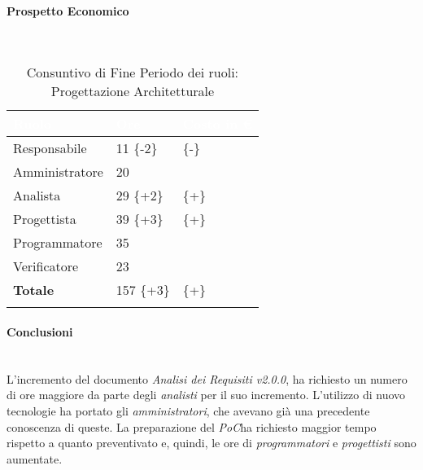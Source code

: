 \paragraph{Prospetto Economico} ~\\

\begin{longtable}{| C{.30\textwidth}| C{.15\textwidth}| C{.20\textwidth}|}
\hline
{}\textbf{\textcolor{white}{Ruolo}} & \textbf{\textcolor{white}{Ore}} & \textbf{\textcolor{white}{Costo in \euro}} \\
\hline 
Responsabile & 11 \{-2\}&  \{-\} \\
\hline
{}Amministratore & 20 &  \\
\hline
Analista & 29 \{+2\} &  \{+\}\\
\hline
{}Progettista & 39 \{+3\} &  \{+\}\\
\hline
Programmatore & 35 &  \\
\hline
{}Verificatore & 23 & \\
\hline
\textbf{Totale} & 157 \{+3\} &  \{+\}\\ 
\hline

\caption{Consuntivo di Fine Periodo dei ruoli: Progettazione Architetturale}
\label{Distribuzione oraria per ruoli del periodo di pa}
\end{longtable}

\paragraph{Conclusioni} ~\\
L'incremento del documento \textit{Analisi dei Requisiti v2.0.0}, ha richiesto un numero di ore maggiore da parte degli \textit{analisti} per il suo incremento. L'utilizzo di nuovo tecnologie ha portato gli \textit{amministratori}, che avevano già una precedente conoscenza di queste. La preparazione del \textit{PoC}\glossario ha richiesto maggior tempo rispetto a quanto preventivato e, quindi, le ore di \textit{programmatori} e \textit{progettisti} sono aumentate. 

\pagebreak



